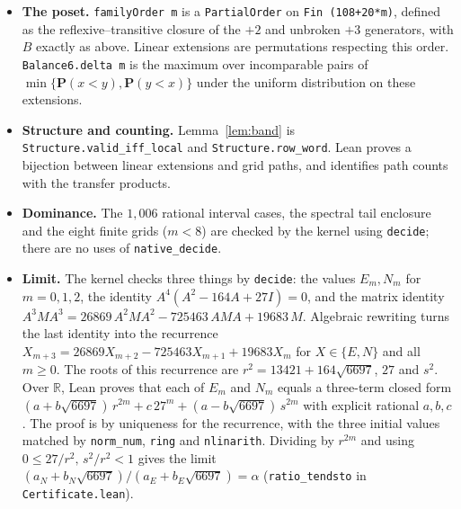 \documentclass[11pt]{amsart}
\theoremstyle{definition}
\theoremstyle{remark}
\newcommand{\Prob}{\mathbf{P}}
\begin{document}
\begin{itemize}
\item \textbf{The poset.} \texttt{familyOrder m} is a \texttt{PartialOrder} on \texttt{Fin (108+20*m)}, defined as the reflexive--transitive closure of the $+2$ and unbroken $+3$ generators, with $B$ exactly as above. Linear extensions are permutations respecting this order. \texttt{Balance6.delta m} is the maximum over incomparable pairs of $\min\{\Prob(x<y),\Prob(y<x)\}$ under the uniform distribution on these extensions.
\item \textbf{Structure and counting.} Lemma~\ref{lem:band} is \texttt{Structure.valid\_iff\_local} and \texttt{Structure.row\_word}. Lean proves a bijection between linear extensions and grid paths, and identifies path counts with the transfer products.
\item \textbf{Dominance.} The $1{,}006$ rational interval cases, the spectral tail enclosure and the eight finite grids ($m<8$) are checked by the kernel using \texttt{decide}; there are no uses of \texttt{native\_decide}.
\item \textbf{Limit.} The kernel checks three things by \texttt{decide}: the values $E_m,N_m$ for $m=0,1,2$, the identity $A^4(A^2-164A+27I)=0$, and the matrix identity $A^3MA^3=26869\,A^2MA^2-725463\,AMA+19683\,M$. Algebraic rewriting turns the last identity into the recurrence $X_{m+3}=26869X_{m+2}-725463X_{m+1}+19683X_m$ for $X\in\{E,N\}$ and all $m\ge0$. The roots of this recurrence are $r^2=13421+164\sqrt{6697}$, $27$ and $s^2$. Over $\mathbb{R}$, Lean proves that each of $E_m$ and $N_m$ equals a three-term closed form $(a+b\sqrt{6697})\,r^{2m}+c\,27^m+(a-b\sqrt{6697})\,s^{2m}$ with explicit rational $a,b,c$. The proof is by uniqueness for the recurrence, with the three initial values matched by \texttt{norm\_num}, \texttt{ring} and \texttt{nlinarith}. Dividing by $r^{2m}$ and using $0\le27/r^2,\,s^2/r^2<1$ gives the limit $(a_N+b_N\sqrt{6697})/(a_E+b_E\sqrt{6697})=\alpha$ (\texttt{ratio\_tendsto} in \texttt{Certificate.lean}).
\end{itemize}
\end{document}
